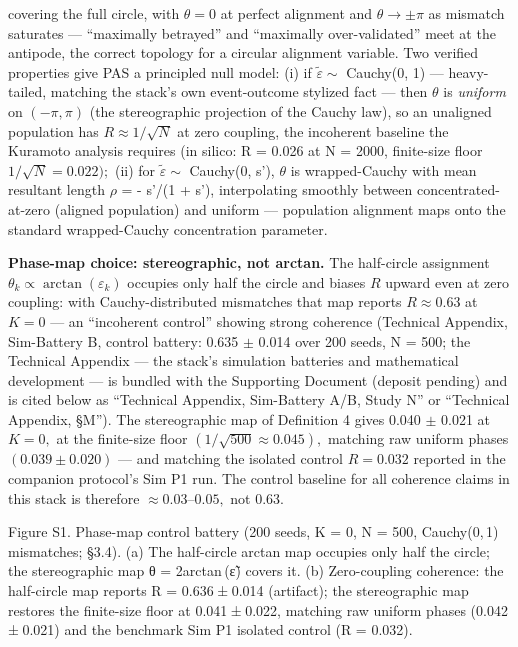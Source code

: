 \documentclass[
]{article}
\begin{document}
covering the full circle, with \(\theta = 0\) at perfect alignment and
\(\theta \to \pm \pi\) as mismatch saturates --- ``maximally betrayed''
and ``maximally over-validated'' meet at the antipode, the correct
topology for a circular alignment variable. Two verified properties give
PAS a principled null model: (i) if \(\tilde{\varepsilon} \sim\)
Cauchy(0, 1) --- heavy-tailed, matching the stack's own event-outcome
stylized fact --- then \(\theta\) is \emph{uniform} on \((-\pi, \pi)\)
(the stereographic projection of the Cauchy law), so an unaligned
population has \(R \approx 1/\sqrt{N}\) at zero coupling, the incoherent
baseline the Kuramoto analysis requires (in silico: R = 0.026 at N =
2000, finite-size floor \(1/\sqrt{N} = 0.022);\) (ii) for
\(\tilde{\varepsilon} \sim\) Cauchy(0, s'), \(\theta\) is wrapped-Cauchy
with mean resultant length \(\rho\) =  - s'\textbar/(1 + s'),
interpolating smoothly between concentrated-at-zero (aligned population)
and uniform --- population alignment maps onto the standard
wrapped-Cauchy concentration parameter.

\textbf{Phase-map choice: stereographic, not arctan.} The half-circle
assignment \(\theta_k \propto \arctan(\varepsilon_k)\) occupies only
half the circle and biases \(R\) upward even at zero coupling: with
Cauchy-distributed mismatches that map reports \(R \approx 0.63\) at
\(K = 0\) --- an ``incoherent control'' showing strong coherence
(Technical Appendix, Sim-Battery B, control battery: 0.635 \(\pm\) 0.014
over 200 seeds, N = 500; the Technical Appendix --- the stack's
simulation batteries and mathematical development --- is bundled with
the Supporting Document (deposit pending) and is cited below as
``Technical Appendix, Sim-Battery A/B, Study N'' or ``Technical
Appendix, §M''). The stereographic map of Definition 4 gives 0.040
\(\pm\) 0.021 at \(K = 0,\) at the finite-size floor
\((1/\sqrt{500} \approx 0.045),\) matching raw uniform phases
\((0.039 \pm 0.020)\) --- and matching the isolated control
\(R = 0.032\) reported in the companion protocol's Sim P1 run. The
control baseline for all coherence claims in this stack is therefore
\(\approx 0.03\)--\(0.05,\) not 0.63.

Figure S1. Phase-map control battery (200 seeds, {K = 0}, {N = 500},
Cauchy{(0, 1)} mismatches; §3.4). (a) The half-circle arctan map
occupies only half the circle; the stereographic map {θ = 2arctan (ε̃)}
covers it. (b) Zero-coupling coherence: the half-circle map reports
{R = 0.636 ± 0.014} (artifact); the stereographic map restores the
finite-size floor at {0.041 ± 0.022}, matching raw uniform phases
({0.042 ± 0.021}) and the benchmark Sim P1 isolated control
({R = 0.032}).
\end{document}
